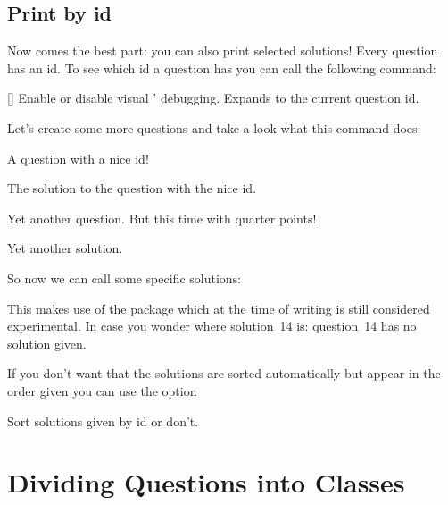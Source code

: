 \documentclass[load-preamble+,scrartcl={DIV10}]{cnltx-doc}
\begin{document}
\subsection{Print by \acs{id}}\label{ssec:ids}
Now comes the best part: you can also print selected solutions!  Every
question has an \acs{id}.  To see which \acs{id} a question has you can call
the following command:
\begin{commands}
  []
    Enable or disable visual \ExSheets' debugging.
  \expandable{}
    Expands to the current question \acs{id}.
\end{commands}
Let's create some more questions and take a look what this command does:
\begin{example}
  \begin{question}[ID=nice!]
    A question with a nice \acs{id}!
  \end{question}
  \begin{solution}
    The solution to the question with the nice \acs{id}.
  \end{solution}
  \begin{question}{3.75}
    Yet another question. But this time with quarter points!
  \end{question}
  \begin{solution}
    Yet another solution.
  \end{solution}
\end{example}

So now we can call some specific solutions:
\begin{example}
  \printsolutions[byID={first,nice!,10,14}]
\end{example}
This makes use of the  package which at the time of writing is
still considered experimental.  In case you wonder where solution~14 is:
question~14 has no solution given.

If you don't want that the solutions are sorted automatically but appear in
the order given you can use the option
\begin{options}
    Sort solutions given by \acs{id} or don't.
\end{options}

\section{Dividing Questions into Classes}\label{sec:dividing-concepts}
\end{document}
